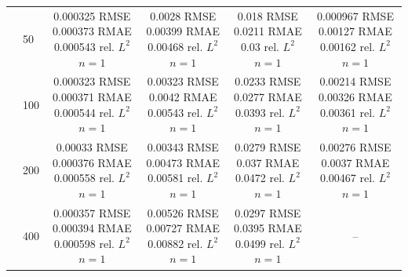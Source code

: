\begin{tabular}{llcccc}
 & 50 & \shortstack{0.000325 RMSE\\0.000373 RMAE\\0.000543 rel. $L^2$\\$n=1$} & \shortstack{0.0028 RMSE\\0.00399 RMAE\\0.00468 rel. $L^2$\\$n=1$} & \shortstack{0.018 RMSE\\0.0211 RMAE\\0.03 rel. $L^2$\\$n=1$} & \shortstack{0.000967 RMSE\\0.00127 RMAE\\0.00162 rel. $L^2$\\$n=1$} \\
 & 100 & \shortstack{0.000323 RMSE\\0.000371 RMAE\\0.000544 rel. $L^2$\\$n=1$} & \shortstack{0.00323 RMSE\\0.0042 RMAE\\0.00543 rel. $L^2$\\$n=1$} & \shortstack{0.0233 RMSE\\0.0277 RMAE\\0.0393 rel. $L^2$\\$n=1$} & \shortstack{0.00214 RMSE\\0.00326 RMAE\\0.00361 rel. $L^2$\\$n=1$} \\
 & 200 & \shortstack{0.00033 RMSE\\0.000376 RMAE\\0.000558 rel. $L^2$\\$n=1$} & \shortstack{0.00343 RMSE\\0.00473 RMAE\\0.00581 rel. $L^2$\\$n=1$} & \shortstack{0.0279 RMSE\\0.037 RMAE\\0.0472 rel. $L^2$\\$n=1$} & \shortstack{0.00276 RMSE\\0.0037 RMAE\\0.00467 rel. $L^2$\\$n=1$} \\
 & 400 & \shortstack{0.000357 RMSE\\0.000394 RMAE\\0.000598 rel. $L^2$\\$n=1$} & \shortstack{0.00526 RMSE\\0.00727 RMAE\\0.00882 rel. $L^2$\\$n=1$} & \shortstack{0.0297 RMSE\\0.0395 RMAE\\0.0499 rel. $L^2$\\$n=1$} & -- \\

\end{tabular}
